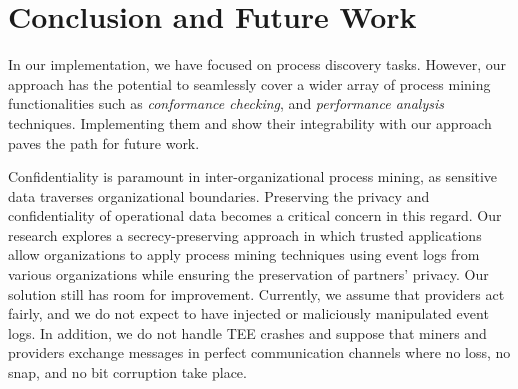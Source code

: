 \section{Conclusion and Future Work}
\label{sec:conclusion}

In our implementation, we have focused on process discovery tasks. However, our approach has the potential to seamlessly cover a wider array of process mining functionalities such as %
\textit{conformance checking}, and \textit{performance analysis} techniques.
Implementing them and show their integrability with our approach paves the path for future work.


Confidentiality is paramount in inter-organizational process mining, as sensitive data traverses organizational boundaries. Preserving the privacy and confidentiality of operational data becomes a critical concern in this regard. Our research explores a secrecy-preserving approach in which trusted applications allow organizations to apply process mining techniques using event logs from various organizations while ensuring the preservation of partners' privacy. Our solution still has room for improvement. Currently, we assume that providers act fairly, and we do not expect to have injected or maliciously manipulated event logs. In addition, we do not handle TEE crashes and suppose that miners and providers exchange messages in perfect communication channels where no loss, no snap, and no bit corruption take place. %
